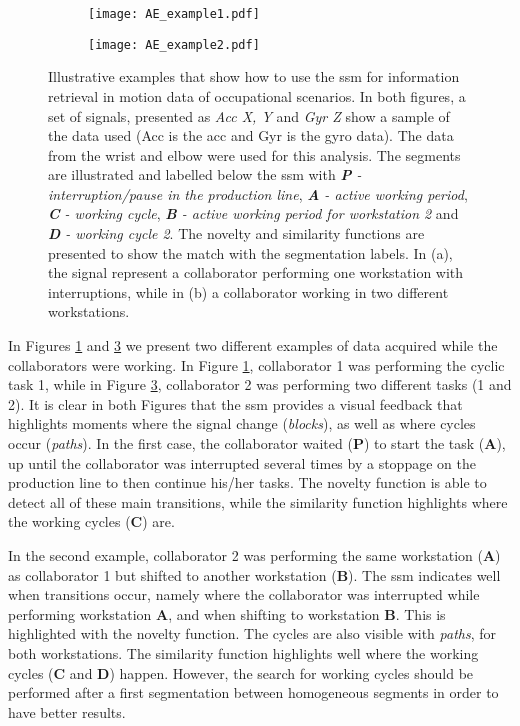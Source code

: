 \begin{figure}
 \begin{subfigure}{0.45\linewidth}
      \texttt{[image: AE\_example1.pdf]}
  \caption{}
  \label{fig:ae_example1}
 \end{subfigure}
 \begin{subfigure}{0.45\linewidth}
      \texttt{[image: AE\_example2.pdf]}
  \caption{}
  \label{fig:ae_example2}
  \end{subfigure}
\caption{Illustrative examples that show how to use the \gls{ssm} for information retrieval in motion data of occupational scenarios. In both figures, a set of signals, presented as \textit{Acc X, Y} and \textit{Gyr Z} show a sample of the data used (Acc is the \gls{acc} and Gyr is the \gls{gyro} data). The data from the wrist and elbow were used for this analysis. The segments are illustrated and labelled below the \gls{ssm} with \textit{\textbf{P} - interruption/pause in the production line}, \textit{\textbf{A} - active working period}, \textit{\textbf{C} - working cycle}, \textit{\textbf{B} - active working period for workstation 2} and \textit{\textbf{D} - working cycle 2}. The novelty and similarity functions are presented to show the match with the segmentation labels. In (a), the signal represent a collaborator performing one workstation with interruptions, while in (b) a collaborator working in two different workstations.}
\end{figure}

In Figures \ref{fig:ae_example1} and \ref{fig:ae_example2} we present two different examples of data acquired while the collaborators were working. In Figure \ref{fig:ae_example1}, collaborator 1 was performing the cyclic task 1, while in Figure \ref{fig:ae_example2}, collaborator 2 was performing two different tasks (1 and 2). It is clear in both Figures that the \gls{ssm} provides a visual feedback that highlights moments where the signal change (\textit{blocks}), as well as where cycles occur (\textit{paths}). In the first case, the collaborator waited (\textbf{P}) to start the task (\textbf{A}), up until the collaborator was interrupted several times by a stoppage on the production line to then continue his/her tasks. The novelty function is able to detect all of these main transitions, while the similarity function highlights where the working cycles (\textbf{C}) are.

In the second example, collaborator 2 was performing the same workstation  (\textbf{A}) as collaborator 1 but shifted to another workstation (\textbf{B}). The \gls{ssm} indicates well when transitions occur, namely where the collaborator was interrupted while performing workstation \textbf{A}, and when shifting to workstation \textbf{B}. This is highlighted with the novelty function. The cycles are also visible with \textit{paths}, for both workstations. The similarity function highlights well where the working cycles (\textbf{C} and \textbf{D}) happen. However, the search for working cycles should be performed after a first segmentation between homogeneous segments in order to have better results. 

